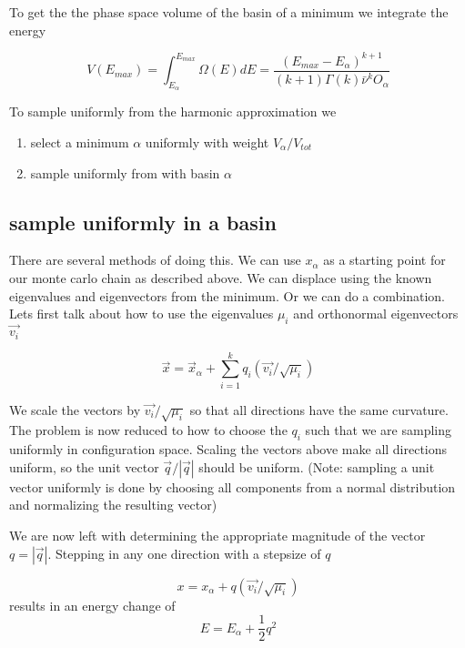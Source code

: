 \documentclass[a4paper]{article}
\begin{document}
To get the the phase space volume of the basin of a minimum we integrate the energy

\begin{equation}
  V(E_{max}) = \int_{E_{\alpha}}^{E_{max}} \Omega(E) dE = \frac{(E_{max} - E_\alpha)^{k+1} }{(k+1)\Gamma(k) \bar{\nu}^k O_\alpha}
\end{equation}

To sample uniformly from the harmonic approximation we

\begin{enumerate}
  \item select a minimum $\alpha$ uniformly with weight $V_{\alpha} / V_{tot}$

  \item sample uniformly from with basin $\alpha$
\end{enumerate}

\subsection{ sample uniformly in a basin}

There are several methods of doing this.  We can use $x_{\alpha}$ as a starting
point for our monte carlo chain as described above.  We can displace using the known
eigenvalues and eigenvectors from the minimum.  Or we can do a combination.  Lets
first talk about how to use the eigenvalues $\mu_i$ and orthonormal eigenvectors $\vec{v_i}$ 

\begin{equation}
  \vec{x} = \vec{x}_{\alpha} + \sum_{i=1}^k q_i (\vec{v_i} / \sqrt{\mu_i})
  \label{eqn:step_away}
\end{equation}

We scale the vectors by $\vec{v_i} / \sqrt{\mu_i}$ so that all directions have
the same curvature.  The problem is now reduced to how to choose the $q_i$ such
that we are sampling uniformly in configuration space.  Scaling the vectors
above make all directions uniform, so the unit vector $\vec{q} / |\vec{q}|$ should be 
uniform. (Note: sampling a unit vector uniformly is done by choosing all components from
a normal distribution and normalizing the resulting vector)

We are now left with determining the appropriate magnitude of the vector $q =
|\vec{q}|$.  Stepping in any one direction with a stepsize of $q$ 

\begin{equation}
  x = x_{\alpha} + q (\vec{v_i} / \sqrt{\mu_i})
\end{equation}
results in an energy change of
\begin{equation}
  E = E_{\alpha} + \frac{1}{2} q^2
  \label{eqn:echange}
\end{equation}
\end{document}
